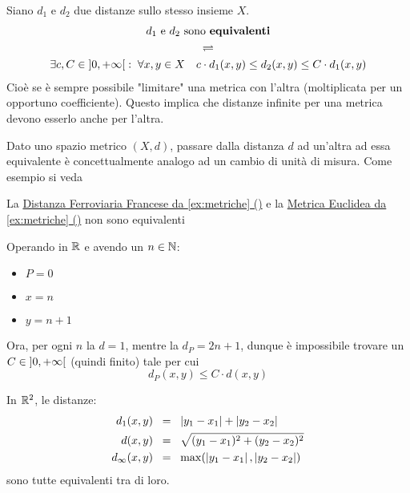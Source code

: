 \begin{definition}
	\label{def:metr_equiv}
	Siano $d_1$ e $d_2$ due distanze sullo stesso insieme $X$.
	\begin{equation*}
		\begin{gathered}
			d_1 \text{ e } d_2 \text{ sono \textbf{equivalenti}}\\
			\rightleftharpoons\\
			\exists c,C \in \left]0,+\infty\right[:\; \forall x,y \in X \quad c \cdot d_1(x,y) \leq d_2 (x,y) \leq C \cdot d_1 (x,y)
		\end{gathered}
	\end{equation*}
	Cioè se è sempre possibile "limitare" una metrica con l'altra (moltiplicata per un opportuno coefficiente). Questo implica che distanze infinite per una metrica devono esserlo anche per l'altra.
	\begin{note}
		Dato uno spazio metrico $(X,d)$, passare dalla distanza $d$ ad un'altra ad essa equivalente è concettualmente analogo ad un cambio di unità di misura. Come esempio si veda 
	\end{note}
\end{definition}
\begin{example}
	La \hyperref[ex:dist_parigi]{Distanza Ferroviaria Francese da \cref*{ex:metriche} ()} e la \hyperref[ex:dist_eucl]{Metrica Euclidea da \cref*{ex:metriche} ()} non sono equivalenti
	\begin{solution}
		Operando in $\mathbb{R}$ e avendo un $n \in \mathbb{N}$:
		\begin{itemize}
			\item $P = 0$
			\item $x = n$
			\item $y = n+1$
		\end{itemize}
		Ora, per ogni $n$ la $d = 1$, mentre la $d_P = 2n+1$, dunque è impossibile trovare un $C \in \left]0,+\infty\right[$ (quindi finito) tale per cui
		$$d_P(x,y) \leq C \cdot d(x,y)$$
	\end{solution}
\end{example}
\begin{example}
	\label{ex:metr_equiv_R2}
	In $\mathbb{R}^2$, le distanze:
	\begin{align*}
		d_1(x,y) \;\; &= \;\; \left|y_1 - x_1\right| + \left|y_2 - x_2\right|\\
		d(x,y) \;\; &= \;\; \sqrt{(y_1 - x_1)^2 + (y_2 - x_2)^2}\\
		d_\infty(x,y) \;\; &= \;\; \max (\left|y_1 - x_1\right|, \left|y_2 - x_2\right|)
	\end{align*}
	sono tutte equivalenti tra di loro.
\end{example}


